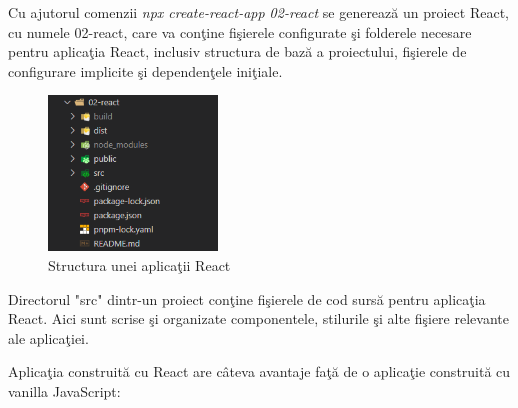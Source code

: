 \documentclass[12pt, a4paper]{report}
\begin{document}
Cu ajutorul comenzii \emph{npx create-react-app 02-react} se genereaz\u a un proiect React, cu numele 02-react, care va con\c tine fi\c sierele configurate \c si folderele necesare pentru aplica\c tia React, inclusiv structura de baz\u a a proiectului, fi\c sierele de configurare implicite \c si dependen\c tele ini\c tiale.

\begin{figure}[htbp]
	\centering
	\includegraphics[width=0.4\textwidth]{react_file_structure.png}
	\caption{Structura unei aplica\c tii React}
	\label{fig:react-structure}
\end{figure}

Directorul "src" dintr-un proiect con\c tine fi\c sierele de cod surs\u a pentru aplica\c tia React. Aici sunt scrise \c si organizate componentele, stilurile \c si alte fi\c siere relevante ale aplica\c tiei.

Aplica\c tia construit\u a cu React are c\^ateva avantaje fa\c t\u a de o aplica\c tie construit\u a cu vanilla JavaScript:
\end{document}
